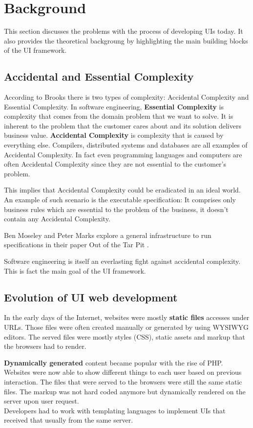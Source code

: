 \section{Background}\label{background}
This section discusses the problems with the process of developing UIs today. It also provides the theoretical backgroung by highlighting the main building blocks of the UI framework.

\subsection{Accidental and Essential Complexity}
According to Brooks there is two types of complexity: Accidental Complexity and Essential Complexity. \citep{nosilverbullet}
In software engineering, \textbf{Essential Complexity} is complexity that comes from the domain problem that we want to solve. It is inherent to the problem that the customer cares about and its solution delivers business value. \textbf{Accidental Complexity} is complexity that is caused by everything else. Compilers, distributed systems and databases are all examples of Accidental Complexity. In fact even programming languages and computers are often Accidental Complexity since they are not essential to the customer's problem.

This implies that Accidental Complexity could be eradicated in an ideal world. An example of such scenario is the executable specification: It comprises only business rules which are essential to the problem of the business, it doesn't contain any Accidental Complexity.

Ben Moseley and Peter Marks explore a general infrastructure to run specifications in their paper Out of the Tar Pit \citep{outoftarpit}.

Software engineering is itself an everlasting fight against accidental complexity. This is fact the main goal of the UI framework.

\subsection{Evolution of UI web development}\label{history}
In the early days of the Internet, websites were mostly \textbf{static files} accesses under URLs. Those files were often created manually or generated by using WYSIWYG editors. The served files were mostly styles (CSS), static assets and markup that the browsers had to render.

\textbf{Dynamically generated} content became popular with the rise of PHP. Websites were now able to show different things to each user based on previous interaction. The files that were served to the browsers were still the same static files. The markup was not hard coded anymore but dynamically rendered on the server upon user request.
\\ Developers had to work with templating languages to implement UIs that received that usually from the same server.

